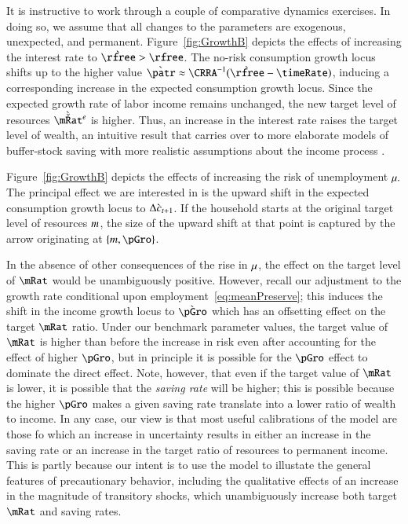 \documentclass[titlepage,abstract]{\econtex}\newcommand{\texname}{ctDiscrete}
\begin{document}
It is instructive to work through a couple of comparative dynamics
exercises. In doing so, we assume that all changes to the parameters
are exogenous, unexpected, and permanent.  
Figure~\ref{fig:GrowthB} depicts the effects of increasing 
the interest rate to $\grave{\rfree}>\rfree$.
The no-risk consumption growth locus shifts
up to the higher value $\grave{\patr} \approx
\CRRA^{-1}(\grave{\rfree}-\timeRate)$, inducing a corresponding
increase in the expected consumption growth locus.  Since the expected
growth rate of labor income remains unchanged, the new target level of
resources $\grave{\check{\mRat}}^{e}$ is higher. Thus, an increase in
the interest rate raises the target level of wealth, an intuitive
result that carries over to more elaborate models of buffer-stock
saving with more realistic assumptions about the income process
\citep{BufferStockTheory}.



Figure~\ref{fig:GrowthB} depicts the effects of increasing the risk of unemployment $\mu.$
The principal effect we are interested in is the upward shift in the expected
consumption growth locus to $\Delta \grave{c}_{t+1}$.  If the
household starts at the original target level of resources
$m$, the size of the upward shift at that point is captured by the
arrow originating at $\{\mTarg,\pGro\}$.  

In the absence of other consequences of the rise in $\mu$, the
effect on the target level of $\mRat$ would be unambiguously positive.
However, recall our adjustment to the growth rate conditional upon
employment~\eqref{eq:meanPreserve}; this induces the shift in the
income growth locus to $\grave{\pGro}$ which has an offsetting effect
on the target $\mRat$ ratio.  Under our benchmark parameter values,
the target value of $\mRat$ is higher than before the increase in risk
even after accounting for the effect of higher $\pGro$, but in
principle it is possible for the $\pGro$ effect to dominate the direct
effect.  Note, however, that even if the target value of $\mRat$ is
lower, it is possible that the \textit{saving rate} will be higher; this
is possible because the higher $\pGro$ makes a given saving
rate translate into a lower ratio of wealth to income.  In any case,
our view is that most useful calibrations of the model are those fo
which an increase in uncertainty results in either an increase in the
saving rate or an increase in the target ratio of resources to
permanent income.  This is partly because our intent is to use the
model to illustate the general features of precautionary behavior,
including the qualitative effects of an increase in the magnitude of
transitory shocks, which unambiguously increase both target $\mRat$
and saving rates.
\end{document}
